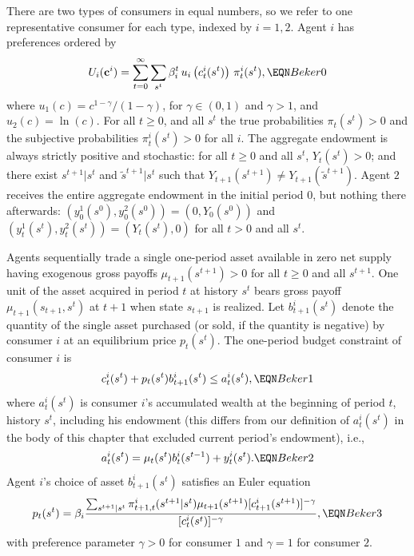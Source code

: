There are two types of consumers in equal numbers, so we refer to
one representative consumer for each type, indexed by $i=1,2$.
Agent $i$ has preferences ordered by
$$ U_i({\bf c}^i) =
   \sum_{t=0}^\infty \sum_{s^t} \beta_i^t 
               \,u_i\left(c_t^i(s^t)\right)\,
   \pi_t^i(s^t),  \EQN Beker0 $$
where  $u_1(c)=c^{1-\gamma}/(1-\gamma)$,
for $\gamma\in(0,1)$ and $\gamma> 1$, and  $u_2(c) = \ln (c)$.
For all $t\geq0$, and all $s^t$ the true
probabilities $\pi_t(s^t)>0$ and the subjective probabilities
$\pi_t^i(s^t)>0$ for all $i$.
The aggregate endowment is always strictly positive and stochastic:
for all $t\geq 0$ and all $s^t$, $Y_t(s^t)>0$; and there exist
$s^{t+1}|s^t$ and $\tilde s^{t+1}|s^t$ such that
$Y_{t+1}(s^{t+1}) \neq Y_{t+1}(\tilde s^{t+1})$.
Agent $2$ receives the entire aggregate
endowment  in the initial period $0$,
but nothing there afterwards: $(y_0^1(s^0), y_0^2(s^0)) = (0, Y_0(s^0))$ and
$(y_t^1(s^t), y_t^2(s^t)) = (Y_t(s^t), 0)$ for all $t> 0$
and all $s^t$.



Agents sequentially trade  a single one-period asset
available in zero net supply having exogenous gross
payoffs $\mu_{t+1}(s^{t+1})>0$ for all $t\ge0$ and all $s^{t+1}$.
One unit of the asset acquired in period $t$ at history $s^t$ bears
 gross payoff $\mu_{t+1}(s_{t+1}, s^t)$ at $t+1$  when
state $s_{t+1}$ is realized. Let $b^i_{t+1}(s^t)$ denote the quantity of
the single asset purchased (or sold, if the quantity is negative)
by consumer $i$ at an equilibrium price $p_t(s^t)$.
The one-period budget constraint of consumer $i$ is
$$ c^i_t(s^t) + p_t(s^t) b^i_{t+1}(s^t) \leq a^i_t(s^t),  \EQN Beker1
$$
where $a^i_t(s^t)$ is consumer $i$'s accumulated wealth at the beginning
of period $t$, history $s^t$, including his endowment (this differs from our definition of $a^i_t(s^t)$
in the body of this chapter
that excluded current period's endowment), i.e.,
$$ a^i_t(s^t) = \mu_t(s^t) b^i_t(s^{t-1}) + y^i_t(s^t).  \EQN Beker2
$$
Agent $i$'s choice of asset $b^i_{t+1}(s^t)$ satisfies an Euler equation
$$
p_t(s^t) = \beta_i {\sum_{s^{t+1} | s^t} 
\pi^i_{t+1,t}(s^{t+1}| s^t)
\mu_{t+1}(s^{t+1}) [c^i_{t+1}(s^{t+1})]^{-\gamma} \over
[c^i_t(s^t)]^{-\gamma} },                                 \EQN Beker3
$$
with preference parameter $\gamma>0$ for consumer $1$ and $\gamma=1$ for
consumer $2$.


